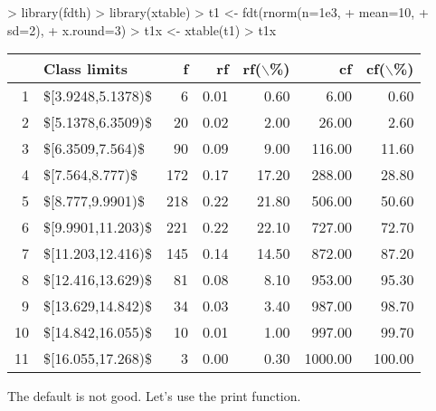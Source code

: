 \documentclass[10pt,a4paper]{article}
\begin{document}
\begin{Schunk}
\begin{Sinput}
> library(fdth)
> library(xtable)
> t1 <- fdt(rnorm(n=1e3,
+                 mean=10,
+                 sd=2),
+           x.round=3)
> t1x <- xtable(t1)
> t1x
\end{Sinput}
% latex table generated in R 4.4.0 by xtable 1.8-4 package
% Fri Nov 17 16:34:40 2023
\begin{table}[ht]
\centering
\begin{tabular}{rlrrrrr}
  \hline
 & Class limits & f & rf & rf($\backslash$\%) & cf & cf($\backslash$\%) \\ 
  \hline
1 & \$[3.9248,5.1378)\$ &   6 & 0.01 & 0.60 & 6.00 & 0.60 \\ 
  2 & \$[5.1378,6.3509)\$ &  20 & 0.02 & 2.00 & 26.00 & 2.60 \\ 
  3 & \$[6.3509,7.564)\$ &  90 & 0.09 & 9.00 & 116.00 & 11.60 \\ 
  4 & \$[7.564,8.777)\$ & 172 & 0.17 & 17.20 & 288.00 & 28.80 \\ 
  5 & \$[8.777,9.9901)\$ & 218 & 0.22 & 21.80 & 506.00 & 50.60 \\ 
  6 & \$[9.9901,11.203)\$ & 221 & 0.22 & 22.10 & 727.00 & 72.70 \\ 
  7 & \$[11.203,12.416)\$ & 145 & 0.14 & 14.50 & 872.00 & 87.20 \\ 
  8 & \$[12.416,13.629)\$ &  81 & 0.08 & 8.10 & 953.00 & 95.30 \\ 
  9 & \$[13.629,14.842)\$ &  34 & 0.03 & 3.40 & 987.00 & 98.70 \\ 
  10 & \$[14.842,16.055)\$ &  10 & 0.01 & 1.00 & 997.00 & 99.70 \\ 
  11 & \$[16.055,17.268)\$ &   3 & 0.00 & 0.30 & 1000.00 & 100.00 \\ 
   \hline
\end{tabular}
\end{table}\end{Schunk}

The default is not good. Let's use the print function.
\end{document}

